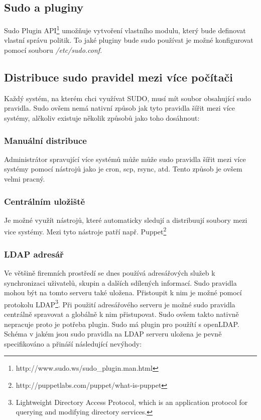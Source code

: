 \documentclass[10pt,a4paper,notitlepage]{article}
\begin{document}
\subsection{Sudo a pluginy}
Sudo Plugin API\footnote{http://www.sudo.ws/sudo\_plugin.man.html}
umožňuje vytvoření vlastního modulu, který bude definovat vlastní správu
politik.  To jaké pluginy bude sudo používat je možné konfigurovat pomocí
souboru \textit{/etc/sudo.conf}.

\subsection{Distribuce sudo pravidel mezi více počítači}
Každý systém, na kterém chci využívat SUDO, musí mít soubor obsahující sudo
pravidla. Sudo ovšem nemá nativní způsob jak tyto pravidla šířit mezi více
systémy, alčkoliv existuje několik způsobů jako toho dosáhnout:

\subsubsection{Manuální distribuce}
Administrátor spravující více systémů může může sudo pravidla šířit mezi více systémy pomocí nástrojů jako je cron, scp, rsync, atd. Tento způsob je ovšem velmi pracný.

\subsubsection{Centrálním uložiště}
Je možné využít nástrojů, které automaticky sledují a distribuují soubory mezi
vice systémy. Mezi tyto nástroje patří např.
Puppet\footnote{http://puppetlabs.com/puppet/what-is-puppet}
 
\subsubsection{LDAP adresář}
Ve většině firemních prostředí se dnes používá adresářových služeb k
synchronizaci uživatelů, skupin a dalších sdílených informací. Sudo pravidla
mohou být na tomto serveru také uložena.  Přistoupit k nim je možné pomocí
protokolu LDAP\footnote{Lightweight Directory Access Protocol, which is an
application protocol for querying and modifying directory services.}. Při
použití adresářového serveru je možné sudo
pravidla centrálně spravovat a globálně k nim přistupovat. Sudo ovšem takto
nativně nepracuje proto je potřeba plugin. Sudo má plugin pro použítí s
openLDAP. Schéma v jakém jsou sudo pravidla na LDAP serveru uložena je pevně
specifikováno a přináší následující nevýhody: 
\end{document}
